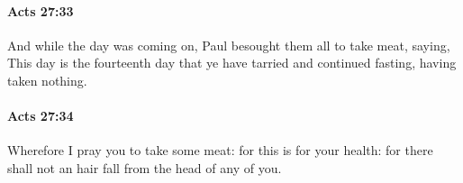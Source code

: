 		\paragraph{Acts 27:33} %
			\label{ACTS-27-33}

			And while the day was coming on, Paul besought them all to take meat, saying, This day is the fourteenth day that ye have tarried and continued fasting, having taken nothing.

			\begin{framed}
			\scriptsize
				\begin{compactdesc}
					\item[SBLG] 
				\end{compactdesc}
			\end{framed}

		\paragraph{Acts 27:34} %
			\label{ACTS-27-34}

			Wherefore I pray you to take some meat: for this is for your health: for there shall not an hair fall from the head of any of you.

